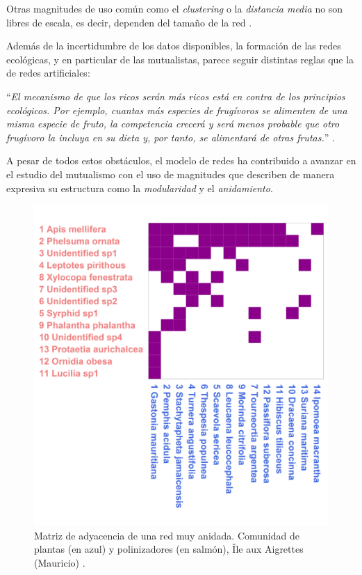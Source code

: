 Otras magnitudes de uso común como el \textit{clustering} o la \textit{distancia media} no son libres de escala, es decir, dependen del tamaño de la red \cite{olesen2006smallest}.

Además de la incertidumbre de los datos disponibles, la formación de las redes ecológicas, y en particular de las mutualistas, parece seguir distintas reglas que la de redes artificiales:

\enquote{\itshape El mecanismo de que los ricos serán más ricos está en contra de los principios ecológicos. Por ejemplo, cuantas más especies de frugívoros se alimenten de una misma especie de fruto, la competencia crecerá y será menos probable que otro frugívoro la incluya en su dieta y, por tanto, se alimentará de otras frutas.} \cite{montoya2006ecological}.

A pesar de todos estos obstáculos, el modelo de redes ha contribuido a avanzar en el estudio del mutualismo con el uso de magnitudes que describen de manera expresiva su estructura como la \textit{modularidad} y el \textit{anidamiento}.
%

\begin{figure}[h!]
\centering
\includegraphics[scale=0.3]{Figures/INTRO_M_PL_011a_matrix.png}
\caption{Matriz de adyacencia de una red muy anidada. Comunidad de plantas (en azul) y polinizadores (en salmón), Île aux Aigrettes (Mauricio) \cite{olesen2002invasion}.}
\label{fig:INTRO_M_PL_011a_matrix}
\end{figure}


